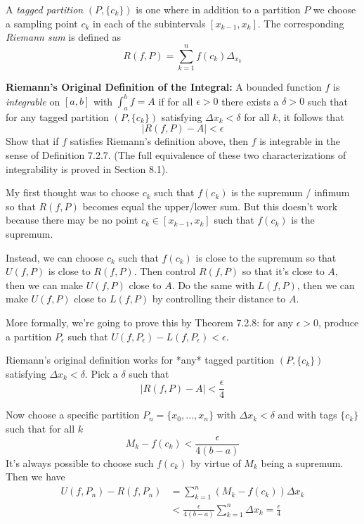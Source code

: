 \documentclass{oxmathproblems}
\begin{document}
\begin{questions}
\miquestion A \textit{tagged partition} $(P, \{c_{k}\})$ is one where in addition to a partition $P$ we choose a sampling point $c_{k}$ in each of the subintervals
$[x_{k-1}, x_{k}]$. The corresponding \textit{Riemann sum} is defined as
\[R(f, P) = \sum_{k=1}^{n}f(c_{k})\Delta_{x_{k}}\]

\textbf{Riemann's Original Definition of the Integral:} A bounded function $f$ is \textit{integrable} on $[a, b]$ with $\int_{a}^{b}f=A$ if for all $\epsilon > 0$ there
exists a $\delta > 0$ such that for any tagged partition $(P, \{c_{k}\})$ satisfying $\Delta{x_{k}} < \delta$ for all $k$, it follows that
\[|R(f, P) - A| < \epsilon\]
Show that if $f$ satisfies Riemann's definition above, then $f$ is integrable in the sense of Definition 7.2.7. (The full equivalence of these two characterizations of integrability
is proved in Section 8.1).

\begin{solution}
  My first thought was to choose $c_{k}$ such that $f(c_{k})$ is the supremum / infimum so that $R(f, P)$ becomes equal the upper/lower sum. But this doesn't work because there
  may be no point $c_{k} \in [x_{k-1}, x_{k}]$ such that $f(c_{k})$ is the supremum.

  Instead, we can choose $c_{k}$ such that $f(c_{k})$ is close to the supremum so that $U(f, P)$ is close to $R(f, P)$.
  Then control $R(f, P)$ so that it's close to $A$, then we can make
  $U(f, P)$ close to $A$. Do the same with $L(f, P)$, then we can make $U(f, P)$ close to $L(f, P)$ by controlling their distance to $A$.

  More formally, we're going to prove this by Theorem 7.2.8: for any $\epsilon > 0$, produce a partition $P_{\epsilon}$
  such that $U(f, P_{\epsilon}) - L(f, P_{\epsilon}) < \epsilon$.

  Riemann's original definition works for *any* tagged partition $(P, \{c_{k}\})$ satisfying $\Delta{x_{k}} < \delta$. Pick a $\delta$ such that
  \[|R(f, P) - A| < \frac{\epsilon}{4}\]
  
  Now choose a specific partition $P_{n} = \{x_{0}, ..., x_{n}\}$ with $\Delta{x_{k}} < \delta$ and with tags $\{c_{k}\}$ such that for all $k$
  \[M_{k}-f(c_{k}) < \frac{\epsilon}{4(b-a)}\]
  It's always possible to choose such $f(c_{k})$ by virtue of $M_{k}$ being a supremum. Then we have
  \begin{align*}
    U(f, P_{n}) - R(f, P_{n}) &= \sum_{k=1}^{n}(M_{k}-f(c_{k}))\Delta{x_{k}}\\
    &< \frac{\epsilon}{4(b-a)} \sum_{k=1}^{n}\Delta{x_{k}}
    = \frac{\epsilon}{4}
  \end{align*}


\end{solution}
\end{questions}
\end{document}
